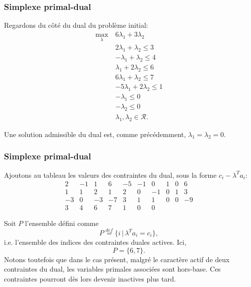\documentclass[t,usepdftitle=false]{beamer}
\def\cR{\mathcal{R}}
\begin{document}
\begin{frame}
\frametitle{Simplexe primal-dual}

Regardons du côté du dual du problème initial:
\begin{align*}
\max_{\lambda}\ & 6\lambda_1 + 3\lambda_2 \\
& 2\lambda_1 + \lambda_2 \leq 3 \\
& -\lambda_1 + \lambda_2 \leq 4 \\
& \lambda_1 + 2\lambda_2 \leq 6 \\
& 6\lambda_1 + \lambda_2 \leq 7 \\
& -5\lambda_1 + 2\lambda_2 \leq 1 \\
& -\lambda_1 \leq 0 \\
& -\lambda_2 \leq 0 \\
& \lambda_1, \lambda_2 \in \cR.
\end{align*}

\mbox{}

Une solution admissible du dual est, comme précédemment, $\lambda_1 = \lambda_2 = 0$.

\end{frame}

\begin{frame}
\frametitle{Simplexe primal-dual}

Ajoutons au tableau les valeurs des contraintes du dual, sous la forme
$c_i - \lambda^T a_i$:
\[
\begin{matrix}
2 & -1 & 1 & 6 & -5 & -1 & 0 & 1 & 0 & 6 \\
1 & 1 & 2 & 1 & 2 & 0 & -1 & 0 & 1 & 3 \\
-3 & 0 & -3 & -7 & 3 & 1 & 1 & 0 & 0 & -9 \\
3 & 4 & 6 & 7 & 1 & 0 & 0
\end{matrix}
\]

\mbox{}

Soit $P$ l'ensemble défini comme
\[
P \overset{def}{=} \lbrace i \,|\, \lambda^T a_i = c_i \rbrace,
\]
i.e. l'ensemble des indices des contraintes duales actives. Ici,
\[
P = \lbrace 6, 7 \rbrace.
\]
Notons toutefois que dans le cas présent, malgré le caractère actif de deux contraintes du dual, les variables primales associées sont hors-base. Ces contraintes pourront dès lors devenir inactives plus tard.

\end{frame}
\end{document}
